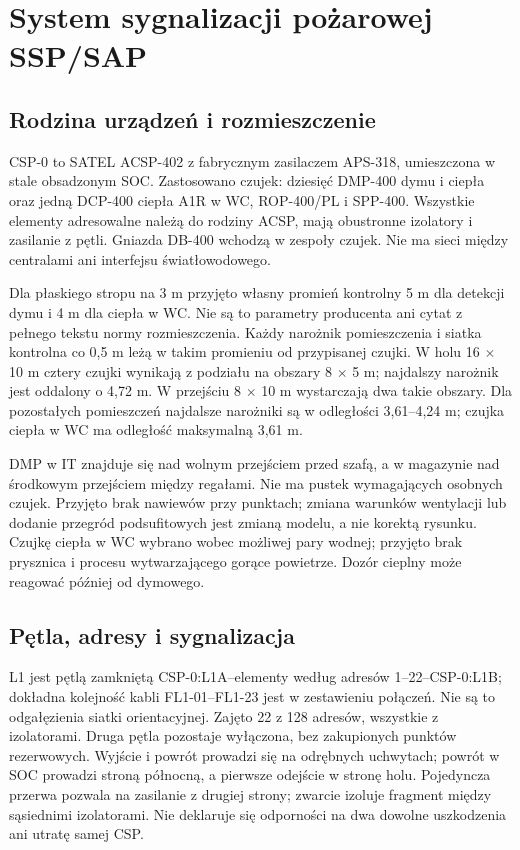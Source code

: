 \section{System sygnalizacji pożarowej SSP/SAP}
\subsection{Rodzina urządzeń i rozmieszczenie}
CSP-0 to SATEL ACSP-402 z fabrycznym zasilaczem APS-318, umieszczona w stale obsadzonym SOC. Zastosowano \FireDetectorCount{} czujek: dziesięć DMP-400 dymu i ciepła oraz jedną DCP-400 ciepła A1R w WC, \RopCount{} ROP-400/PL i \FireSounderCount{} SPP-400. Wszystkie elementy adresowalne należą do rodziny ACSP, mają obustronne izolatory i zasilanie z pętli. Gniazda DB-400 wchodzą w zespoły czujek. Nie ma sieci między centralami ani interfejsu światłowodowego.\cite{S-FIRE,S-DMP,S-ROP,S-SND}

Dla płaskiego stropu na 3 m przyjęto własny promień kontrolny 5 m dla detekcji dymu i 4 m dla ciepła w WC. Nie są to parametry producenta ani cytat z pełnego tekstu normy rozmieszczenia. Każdy narożnik pomieszczenia i siatka kontrolna co 0,5 m leżą w takim promieniu od przypisanej czujki. W holu 16 $\times$ 10 m cztery czujki wynikają z podziału na obszary 8 $\times$ 5 m; najdalszy narożnik jest oddalony o 4,72 m. W przejściu 8 $\times$ 10 m wystarczają dwa takie obszary. Dla pozostałych pomieszczeń najdalsze narożniki są w odległości 3,61--4,24 m; czujka ciepła w WC ma odległość maksymalną 3,61 m.

DMP w IT znajduje się nad wolnym przejściem przed szafą, a w magazynie nad środkowym przejściem między regałami. Nie ma pustek wymagających osobnych czujek. Przyjęto brak nawiewów przy punktach; zmiana warunków wentylacji lub dodanie przegród podsufitowych jest zmianą modelu, a nie korektą rysunku. Czujkę ciepła w WC wybrano wobec możliwej pary wodnej; przyjęto brak prysznica i procesu wytwarzającego gorące powietrze. Dozór cieplny może reagować później od dymowego.

\FirePointTable

\subsection{Pętla, adresy i sygnalizacja}
L1 jest pętlą zamkniętą CSP-0:L1A--elementy według adresów 1--22--CSP-0:L1B; dokładna kolejność kabli FL1-01--FL1-23 jest w zestawieniu połączeń. Nie są to odgałęzienia siatki orientacyjnej. Zajęto 22 z 128 adresów, wszystkie z izolatorami. Druga pętla pozostaje wyłączona, bez zakupionych punktów rezerwowych. Wyjście i powrót prowadzi się na odrębnych uchwytach; powrót w SOC prowadzi stroną północną, a pierwsze odejście w stronę holu. Pojedyncza przerwa pozwala na zasilanie z drugiej strony; zwarcie izoluje fragment między sąsiednimi izolatorami. Nie deklaruje się odporności na dwa dowolne uszkodzenia ani utratę samej CSP.\cite{S-FIRE,S-FIRE-USER}

